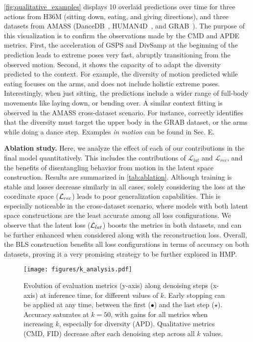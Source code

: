 \documentclass[10pt,twocolumn,letterpaper]{article}
\begin{document}
\autoref{fig:qualitative_examples} displays 10 overlaid predictions over time for three actions from H36M (sitting down, eating, and giving directions), and three datasets from AMASS (DanceDB~\cite{dancedb}, HUMAN4D~\cite{chatzitofis2020human4d}, and GRAB~\cite{taheri2020grab}). The purpose of this visualization is to confirm the observations made by the CMD and APDE metrics. First, the acceleration of GSPS and DivSamp at the beginning of the prediction leads to extreme poses very fast, abruptly transitioning from the observed motion. Second, it shows the capacity of \modelname{} to adapt the diversity predicted to the context. For example, the diversity of motion predicted while eating focuses on the arms, and does not include holistic extreme poses. Interestingly, when just sitting, the predictions include a wider range of full-body movements like laying down, or bending over. A similar context fitting is observed in the AMASS cross-dataset scenario. For instance, \modelname{} correctly identifies that the diversity must target the upper body in the GRAB dataset, or the arms while doing a dance step. Examples \textit{in motion} can be found in \supp{} Sec. E.






\textbf{Ablation study.} Here, we analyze the effect of each of our contributions in the final model quantitatively. This includes the contributions of $\mathcal{L}_{lat}$ and $\mathcal{L}_{rec}$, and the benefits of disentangling behavior from motion in the latent space construction. Results are summarized in \autoref{tab:ablation}. Although training is stable and losses decrease similarly in all cases, solely considering the loss at the coordinate space ($\mathcal{L}_{rec}$) leads to poor generalization capabilities. This is especially noticeable in the cross-dataset scenario, where models with both latent space constructions are the least accurate among all loss configurations. We observe that the latent loss ($\mathcal{L}_{lat}$) boosts the metrics in both datasets, and can be further enhanced when considered along with the reconstruction loss. Overall, the BLS construction benefits all loss configurations in terms of accuracy on both datasets, proving it a very promising strategy to be further explored in HMP.



\begin{figure*}[t!]
    \centering
    \texttt{[image: figures/k\_analysis.pdf]}
    \vspace{-0.4cm}
    \caption{Evolution of evaluation metrics (y-axis) along denoising steps (x-axis) at inference time, for different values of $k$. Early stopping can be applied at any time, between the first ($\bullet$) and the last step ($\star$). Accuracy saturates at $k=50$, with gains for all metrics when increasing $k$, especially for diversity (APD). Qualitative metrics (CMD, FID) decrease after each denoising step across all $k$ values.}
    \label{fig:k_analysis}
    \vspace{-0.1cm}
\end{figure*}
\end{document}

